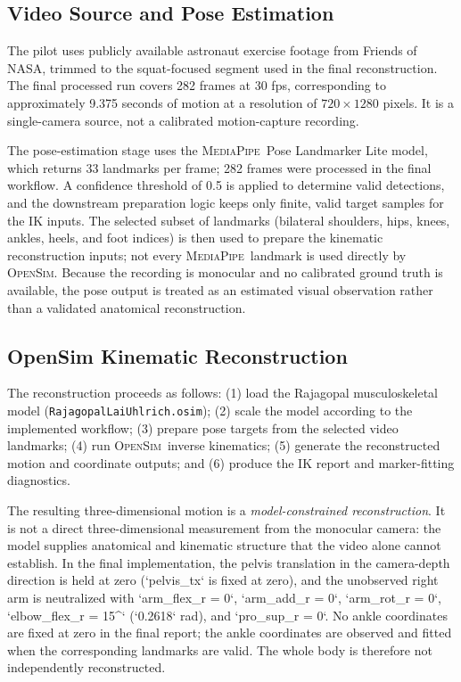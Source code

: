 \documentclass[11pt,a4paper]{article}
\newcommand{\OpenSim}{\textsc{OpenSim}}
\newcommand{\MediaPipe}{\textsc{MediaPipe}}
\begin{document}
\subsection{Video Source and Pose Estimation}

The pilot uses publicly available astronaut exercise footage from Friends of NASA, trimmed to the squat-focused segment used in the final reconstruction. The final processed run covers 282 frames at 30 fps, corresponding to approximately 9.375 seconds of motion at a resolution of $720\times1280$ pixels. It is a single-camera source, not a calibrated motion-capture recording.

The pose-estimation stage uses the \MediaPipe\ Pose Landmarker Lite model, which returns 33 landmarks per frame; 282 frames were processed in the final workflow. A confidence threshold of 0.5 is applied to determine valid detections, and the downstream preparation logic keeps only finite, valid target samples for the IK inputs. The selected subset of landmarks (bilateral shoulders, hips, knees, ankles, heels, and foot indices) is then used to prepare the kinematic reconstruction inputs; not every \MediaPipe\ landmark is used directly by \OpenSim. Because the recording is monocular and no calibrated ground truth is available, the pose output is treated as an estimated visual observation rather than a validated anatomical reconstruction.

\subsection{OpenSim Kinematic Reconstruction}

The reconstruction proceeds as follows: (1) load the Rajagopal musculoskeletal model (\texttt{Rajagopal\allowbreak LaiUhlrich\allowbreak.osim}); (2) scale the model according to the implemented workflow; (3) prepare pose targets from the selected video landmarks; (4) run \OpenSim\ inverse kinematics; (5) generate the reconstructed motion and coordinate outputs; and (6) produce the IK report and marker-fitting diagnostics.

The resulting three-dimensional motion is a \emph{model-constrained reconstruction}. It is not a direct three-dimensional measurement from the monocular camera: the model supplies anatomical and kinematic structure that the video alone cannot establish. In the final implementation, the pelvis translation in the camera-depth direction is held at zero (`pelvis_tx` is fixed at zero), and the unobserved right arm is neutralized with `arm_flex_r = 0`, `arm_add_r = 0`, `arm_rot_r = 0`, `elbow_flex_r = 15^\circ` (`0.2618` rad), and `pro_sup_r = 0`. No ankle coordinates are fixed at zero in the final report; the ankle coordinates are observed and fitted when the corresponding landmarks are valid. The whole body is therefore not independently reconstructed.
\end{document}
